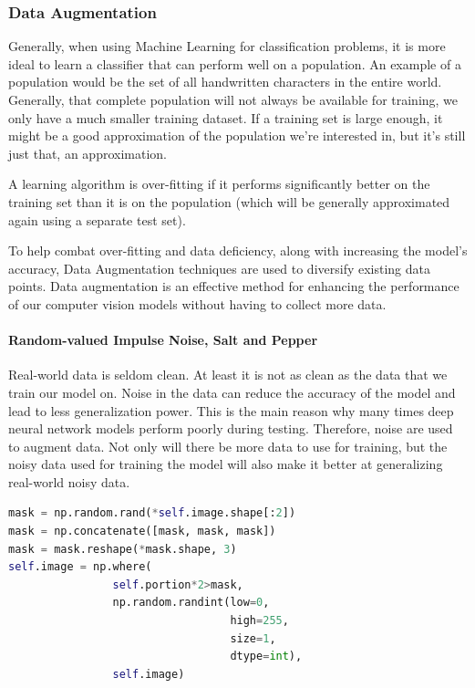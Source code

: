 \subsubsection{Data Augmentation}
    Generally, when using Machine Learning for classification problems, it is more ideal to learn a classifier that can perform well on a population. 
    An example of a population would be the set of all handwritten characters in the entire world. Generally, that complete population will not always be available for training, we only have a much smaller training dataset. 
    If a training set is large enough, it might be a good approximation of the population we're interested in, but it's still just that, an approximation.
    
    A learning algorithm is over-fitting if it performs significantly better on the training set than it is on the population (which will be generally approximated again using a separate test set).
    
    To help combat over-fitting and data deficiency, along with increasing the model's accuracy, Data Augmentation techniques are used to diversify existing data points.
    Data augmentation is an effective method for enhancing the performance of our computer vision models without having to collect more data.
    
    \paragraph{Random-valued Impulse Noise, Salt and Pepper}
        Real-world data is seldom clean. At least it is not as clean as the data that we train our model on. 
        Noise in the data can reduce the accuracy of the model and lead to less generalization power. 
        This is the main reason why many times deep neural network models perform poorly during testing. 
        Therefore, noise are used to augment data. Not only will there be more data to use for training, 
        but the noisy data used for training the model will also make it better at generalizing real-world noisy data.
        \begin{lstlisting}[language=Python]
mask = np.random.rand(*self.image.shape[:2])
mask = np.concatenate([mask, mask, mask])
mask = mask.reshape(*mask.shape, 3)
self.image = np.where(
                self.portion*2>mask,
                np.random.randint(low=0, 
                                  high=255, 
                                  size=1, 
                                  dtype=int),
                self.image) 
        \end{lstlisting}
